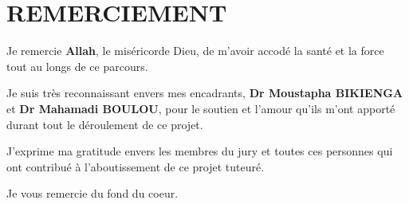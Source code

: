 \chapter*{REMERCIEMENT}
\thispagestyle{MyStyle}

 {\huge Je} remercie \textbf{Allah}, le miséricorde Dieu, de m'avoir accodé la santé et la force tout au longs de ce parcours.
 
 
 {\huge Je} suis très reconnaissant envers mes encadrants, \textbf{Dr Moustapha BIKIENGA} et \textbf{Dr Mahamadi BOULOU}, pour le soutien et l'amour qu'ils m'ont apporté durant tout le déroulement de ce projet. 
 
 {\huge J}'exprime ma gratitude envers les membres du jury et toutes ces personnes qui ont contribué à l'aboutissement de ce projet tuteuré.
 
 \vspace{1 cm}
 \hspace{8 cm}
 {\huge Je} vous remercie du fond du coeur.
 